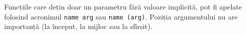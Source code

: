 \begin{listing}
	\label{defaultparametrs}
	\inputminted[linenos]{icl}{../sources/defaultparametrs.icL}
\end{listing}

Funcțiile care dețin doar un parametru fără valoare implicită, pot fi apelate folosind acronimul \texttt{name arg} sau \texttt{name (arg)}. Poziția argumentului nu are importanță (la început, la mijloc sau la sfîrșit).
